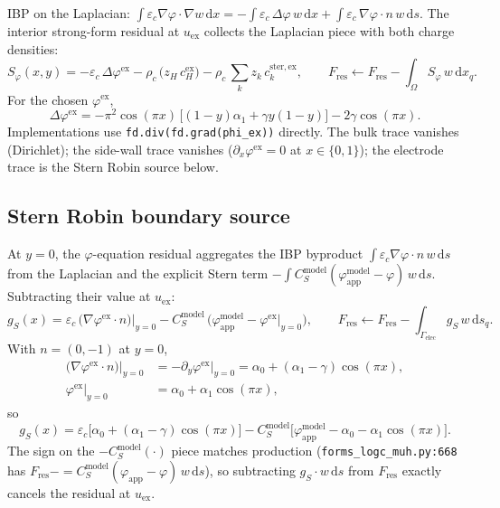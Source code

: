 \documentclass[11pt]{article}
\newcommand{\elec}{\mathrm{elec}}
\newcommand{\ster}{\mathrm{ster}}
\newcommand{\app}{\mathrm{app}}
\newcommand{\modl}{\mathrm{model}}
\begin{document}
IBP on the Laplacian:
$\int \varepsilon_c \nabla\varphi \cdot \nabla w\, \mathrm{d}x
 = -\int \varepsilon_c\, \Delta\varphi\, w\, \mathrm{d}x
 + \int \varepsilon_c\, \nabla\varphi \cdot n\, w\, \mathrm{d}s$.
The interior strong-form residual at $u_\mathrm{ex}$ collects the Laplacian
piece with both charge densities:
\begin{equation}
\boxed{
  S_\varphi(x,y) = -\varepsilon_c\, \Delta\varphi^\mathrm{ex}
                 - \rho_c\, \bigl(z_H\, c_H^\mathrm{ex}\bigr)
                 - \rho_c\, \sum_k z_k\, c_k^{\ster,\mathrm{ex}},
  \qquad
  F_\mathrm{res} \leftarrow F_\mathrm{res} - \int_\Omega S_\varphi\, w\, \mathrm{d}x_q.
}
\end{equation}
For the chosen $\varphi^\mathrm{ex}$,
\begin{equation}
  \Delta\varphi^\mathrm{ex} = -\pi^2 \cos(\pi x)\,\bigl[(1-y)\alpha_1 + \gamma y(1-y)\bigr]
                            - 2\gamma \cos(\pi x).
\end{equation}
Implementations use \verb|fd.div(fd.grad(phi_ex))| directly. The bulk
trace vanishes (Dirichlet); the side-wall trace vanishes
($\partial_x\varphi^\mathrm{ex} = 0$ at $x \in \{0,1\}$); the electrode
trace is the Stern Robin source below.

\subsection{Stern Robin boundary source}

At $y=0$, the $\varphi$-equation residual aggregates the IBP byproduct
$\int \varepsilon_c \nabla\varphi \cdot n\, w\, \mathrm{d}s$ from the
Laplacian and the explicit Stern term $-\int C_S^\modl(\varphi_\app^\modl
- \varphi)\, w\, \mathrm{d}s$. Subtracting their value at $u_\mathrm{ex}$:
\begin{equation}
\boxed{
  g_S(x) = \varepsilon_c\,\bigl(\nabla\varphi^\mathrm{ex}\cdot n\bigr)\bigl|_{y=0}
         - C_S^\modl\,\bigl(\varphi_\app^\modl - \varphi^\mathrm{ex}\bigl|_{y=0}\bigr),
  \qquad
  F_\mathrm{res} \leftarrow F_\mathrm{res} - \int_{\Gamma_\elec} g_S\, w\, \mathrm{d}s_q.
}
\end{equation}
With $n = (0,-1)$ at $y=0$,
\begin{align}
  \bigl(\nabla\varphi^\mathrm{ex}\cdot n\bigr)\bigl|_{y=0}
  &= -\partial_y \varphi^\mathrm{ex}\bigl|_{y=0}
   = \alpha_0 + (\alpha_1 - \gamma) \cos(\pi x), \\
  \varphi^\mathrm{ex}\bigl|_{y=0} &= \alpha_0 + \alpha_1 \cos(\pi x),
\end{align}
so
\begin{equation}
  g_S(x) = \varepsilon_c\bigl[\alpha_0 + (\alpha_1-\gamma)\cos(\pi x)\bigr]
         - C_S^\modl\bigl[\varphi_\app^\modl - \alpha_0 - \alpha_1\cos(\pi x)\bigr].
\end{equation}
The sign on the $-C_S^\modl(\cdot)$ piece matches production
(\verb|forms_logc_muh.py:668| has $F_\mathrm{res} \mathrel{-{=}} C_S^\modl(\varphi_\app
- \varphi)\, w\, \mathrm{d}s$), so subtracting $g_S \cdot w\, \mathrm{d}s$ from
$F_\mathrm{res}$ exactly cancels the residual at $u_\mathrm{ex}$.
\end{document}
